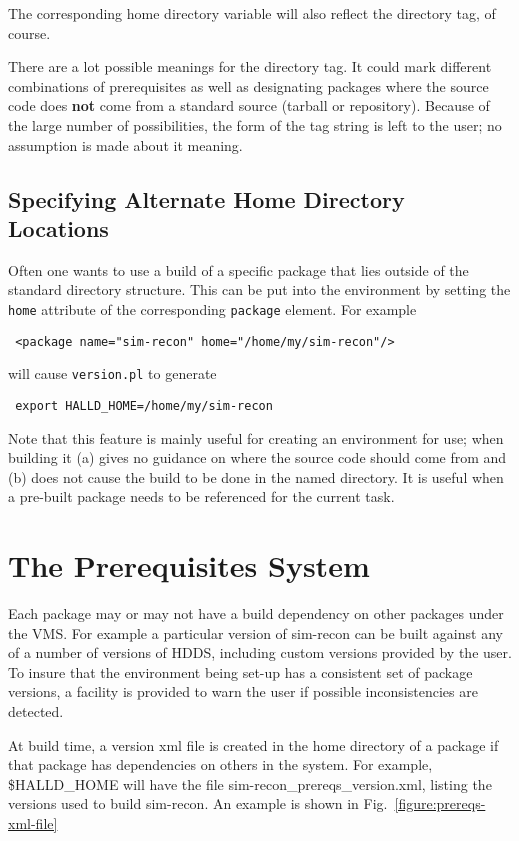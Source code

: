 \documentclass[12pt]{article}
\begin{document}
The corresponding home directory variable will also reflect the
directory tag, of course.

There are a lot possible meanings for the directory tag. It could mark
different combinations of prerequisites as well as designating
packages where the source code does {\bf not} come from a standard
source (tarball or repository). Because of the large number of
possibilities, the form of the tag string is left to the user; no
assumption is made about it meaning.

\subsection{Specifying Alternate Home Directory Locations}

Often one wants to use a build of a specific package that lies outside
of the standard directory structure. This can be put into the
environment by setting the {\tt home} attribute of the corresponding
{\tt package} element. For example
\begin{center} \tt
<package name="sim-recon" home="/home/my/sim-recon"/>
\end{center}
will cause {\tt version.pl} to generate
\begin{center} \tt
export HALLD\_HOME=/home/my/sim-recon
\end{center}
Note that this feature is mainly useful for creating an environment
for use; when building it (a) gives no guidance on where the source
code should come from and (b) does not cause the build to be done in
the named directory. It is useful when a pre-built package needs to be
referenced for the current task.

\section{The Prerequisites System}\label{section:prerequisites-system}

Each package may or may not have a build dependency on other packages
under the VMS. For example a particular version of sim-recon can be
built against any of a number of versions of HDDS, including custom
versions provided by the user. To insure that the environment being
set-up has a consistent set of package versions, a facility is
provided to warn the user if possible inconsistencies are detected.

At build time, a version xml file is created in the home directory of
a package if that package has dependencies on others in the
system. For example, \$HALLD\_HOME will have the file
sim-recon\_prereqs\_version.xml, listing the versions used to build
sim-recon. An example is shown in Fig.~\ref{figure:prereqs-xml-file}
\end{document}
